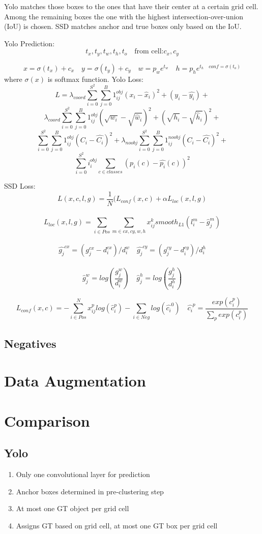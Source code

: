 \documentclass{article}
\begin{document}
Yolo matches those boxes to the ones that have their center at a certain grid cell. Among the remaining boxes the one with the highest intersection-over-union (IoU) is chosen. SSD matches anchor and true boxes only based on the IoU.

Yolo Prediction:
$$t_x,t_y,t_w,t_h,t_o \quad \text{from cell:} c_x, c_y$$

$$x = \sigma(t_x) + c_x \quad y = \sigma(t_y) + c_y \quad w = p_w e^{t_w} \quad h = p_he^{t_h \quad conf = \sigma(t_o)}$$
where $\sigma(x)$ is softmax function.
Yolo Loss:\\
$$ L = \lambda_{coord} \sum_{i=0}^{S^2}\sum_{j=0}^{B} 1^{obj}_{ij}(x_i - \hat{x}_i)^2 + (y_i - \hat{y_i})+$$
$$
\lambda_{coord} \sum_{i=0}^{S^2}\sum_{j=0}^{B} 1^{obj}_{ij}(\sqrt{w_i} - \sqrt{\hat{w}_i})^2 + (\sqrt{h_i} - \sqrt{\hat{h}_i})^2 +$$ 
$$\sum_{i=0}^{S^2}\sum_{j=0}^{B} 1^{obj}_{ij} (C_i - \hat{C_i})^2
+ 
\lambda_{noobj} \sum_{i=0}^{S^2}\sum_{j=0}^{B} 1^{noobj}_{ij} (C_i - \hat{C_i})^2
+ $$$$
\sum_{i=0}^{S^2}i_i^{obj} \sum_{c \in classes}(p_i(c) - \hat{p_i}(c))^2$$

SSD Loss:\\
$$L(x,c,l,g) = \frac{1}{N} (L_{conf}(x,c) +\alpha L_{loc}(x,l,g)$$\\
$$L_{loc}(x,l,g) = \sum_{i \in Pos}\sum_{m \in {cx,cy,w,h}} x_{ij}^k smooth_{L1} (l_i^m - \hat{g}^m_j)$$\\
$$\hat{g_j}^{cx} = (g_j^{cx} - d_i^{cx})/d_i^{w} \quad \hat{g_j}^{cy} = (g_j^{cy} - d_i^{cy})/d_i^{h}$$\\
$$\hat{g}_j^w = log(\frac{g_j^w}{d_i^w}) \quad \hat{g}_j^h = log(\frac{g_j^h}{d_i^h})$$

$$L_{conf}(x,c) = - \sum_{i \in Pos}^{N} x_{ij}^p log(\hat{c}_i^p) - \sum_{i \in Neg} log(\hat{c_i}^0) \quad \hat{c_i}^p = \frac{exp(c_i^p)}{\sum_{p} exp(c_i^p)}$$
\subsection{Negatives}

\section{Data Augmentation}

\section{Comparison}
\subsection{Yolo}
\begin{enumerate}
	\item Only one convolutional layer for prediction
	\item Anchor boxes determined in pre-clustering step
	\item At most one GT object per grid cell
	\item Assigns GT based on grid cell, at most one GT box per grid cell
\end{enumerate}
\end{document}
